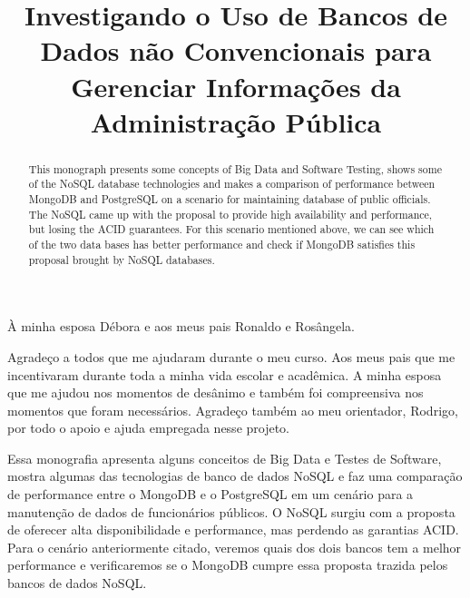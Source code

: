 \documentclass[licenciatura]{unb-cic}
\title{Investigando o {U}so de {B}ancos de {D}ados não {C}onvencionais para 
{G}erenciar {I}nformações da {A}dministração {P}ública}
\begin{document}
  \maketitle
  \pretextual

  \begin{dedicatoria}
À minha esposa Débora e aos meus pais Ronaldo e Rosângela.
  \end{dedicatoria}

  \begin{agradecimentos}
  Agradeço a todos que me ajudaram durante o meu curso. Aos meus pais que me incentivaram durante toda a minha vida escolar e acadêmica. A minha esposa que me ajudou nos momentos de desânimo e também foi compreensiva nos momentos que foram necessários.
Agradeço também ao meu orientador, Rodrigo, por todo o apoio e ajuda empregada nesse projeto.
  \end{agradecimentos}

  \begin{resumo}
Essa monografia apresenta alguns conceitos de Big Data e Testes de Software, mostra algumas das tecnologias de banco de dados NoSQL e  faz uma comparação de performance entre o MongoDB e o PostgreSQL em um cenário para a manutenção de dados de funcionários públicos. O NoSQL surgiu com a proposta de oferecer alta disponibilidade e performance, mas perdendo as garantias ACID. Para o cenário anteriormente citado, veremos quais dos dois bancos tem a melhor performance e verificaremos se o MongoDB cumpre essa proposta trazida pelos bancos de dados NoSQL.
  \end{resumo}

  \begin{abstract}
This monograph presents some concepts of Big Data and Software Testing, shows some of the NoSQL database technologies and makes a comparison of performance between MongoDB and PostgreSQL on a scenario for maintaining database of public officials. The NoSQL came up with the proposal to provide high availability and performance, but losing the ACID guarantees. For this scenario mentioned above, we can see which of the two data bases has better performance and check if MongoDB satisfies this proposal brought by NoSQL databases.
  \end{abstract}

  \tableofcontents
  \listoffigures
  \listoftables

  \textual
  

  
  
  

  \postextual
  
  
\end{document}
